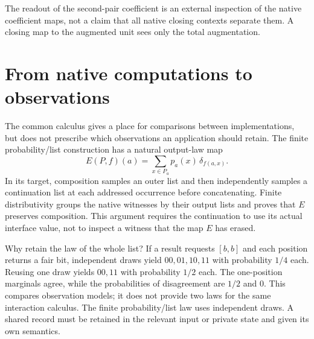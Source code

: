 \documentclass[11pt]{article}
\numberwithin{equation}{section}
\theoremstyle{definition}\newtheorem{definition}[theorem]{Definition}
\begin{document}
The readout of the second-pair coefficient is an external inspection of
the native coefficient maps, not a claim that all native closing contexts
separate them. A closing map to the augmented unit sees only the total
augmentation.

\section{From native computations to observations}\label{sec:observations}
The common calculus gives a place for comparisons between implementations,
but does not prescribe which observations an application should retain.
The finite probability/list construction has a natural output-law map
\[
 E(P,f)(a)=\sum_{x\in P_a}p_a(x)\,\delta_{f(a,x)}.
\]
In its target, composition samples an outer list and then independently
samples a continuation list at each addressed occurrence before
concatenating. Finite distributivity groups the native witnesses by their
output lists and proves that $E$ preserves composition. This argument
requires the continuation to use its actual interface value, not to inspect
a witness that the map $E$ has erased.

Why retain the law of the whole list? If a result requests $[b,b]$ and each
position returns a fair bit, independent draws yield $00,01,10,11$ with
probability $1/4$ each. Reusing one draw yields $00,11$ with probability
$1/2$ each. The one-position marginals agree, while the probabilities of
disagreement are $1/2$ and $0$. This compares observation models; it does
not provide two laws for the same interaction calculus. The finite
probability/list law uses independent draws. A shared record must be
retained in the relevant input or private state and given its own semantics.
\end{document}
